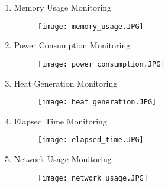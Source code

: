 \documentclass{article}
\begin{document}
\begin{enumerate}
\begin{enumerate}
                    \item{Memory Usage Monitoring}
                    \begin{figure}[H]
                    	\centering
                        \texttt{[image: memory\_usage.JPG]}
                        \newline
                        \newline
                    \end{figure}
                    
                    
                    \item{Power Consumption Monitoring}
                    \begin{figure}[H]
                    	\centering
                        \texttt{[image: power\_consumption.JPG]}
                        \newline
                        \newline
                    \end{figure}
                    
                    \item{Heat Generation Monitoring}
                    \begin{figure}[H]
                    	\centering
                        \texttt{[image: heat\_generation.JPG]}
                        \newline
                        \newline
                    \end{figure}
                    
                    \item{Elapsed Time Monitoring}
                    \begin{figure}[H]
                    	\centering
                        \texttt{[image: elapsed\_time.JPG]}
						\newline
                        \newline
                    \end{figure}
                    
                    \item{Network Usage Monitoring}
                    \begin{figure}[H]
                    	\centering
                        \texttt{[image: network\_usage.JPG]}
                        \newline
                        \newline
                    \end{figure}
                    

\end{enumerate}
\end{enumerate}
\end{document}
